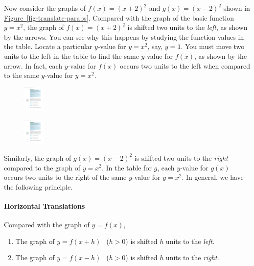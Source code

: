 \documentclass[10pt,]{book}
\theoremstyle{plain}
\theoremstyle{definition}
\theoremstyle{definition}
\theoremstyle{definition}
\theoremstyle{definition}
\theoremstyle{definition}
\numberwithin{equation}{section}
\newcommand{\gt}{ > }
\begin{document}
    Now consider the graphs of \(f (x) = (x + 2)^2\) and \(g(x) = (x − 2)^2\) shown in \hyperref[fig-translate-parabs]{Figure~\ref{fig-translate-parabs}}. Compared with the graph of the basic function \(y = x^2\), the graph of \(f (x) = (x + 2)^2\) is shifted two units to the \emph{left}, as shown by the arrows. You can see why this happens by studying the function values in the table. Locate a particular \(y\)-value for \(y = x^2\), say, \(y = 1\). You must move two units to the left in the table to find the same \(y\)-value for \(f (x)\), as shown by the arrow. In fact, each \(y\)-value for \(f (x)\) occurs two units to the left when compared to the same \(y\)-value for \(y = x^2\).
    \leavevmode%
\begin{figure}
\centering
\includegraphics[width=0.100\textwidth,]{images/fig-table-translate-left.pdf}\caption{\label{fig-table-translate-left}}
\end{figure}

%
\par

    \leavevmode%
\begin{figure}
\centering
\includegraphics[width=0.100\textwidth,]{images/fig-table-translate-right.pdf}\caption{\label{fig-table-translate-right}}
\end{figure}

    Similarly, the graph of \(g(x) = (x − 2)^2\) is shifted two units to the \emph{right} compared to the graph of \(y = x^2\). In the table for \(g\), each \(y\)-value for \(g(x)\) occurs two units to the right of the same \(y\)-value for \(y = x^2\). In general, we have the following principle.
%
\typeout{************************************************}
\typeout{************************************************}
\paragraph[Horizontal Translations]{Horizontal Translations}\label{paragraphs-28}
%
\par

    Compared with the graph of \(y = f (x)\),
    \leavevmode%
\begin{enumerate}
\item\hypertarget{li-294}{}The graph of \(y = f (x + h)~ ~\) (\(h \gt 0\)) is shifted \(h\) units to the \emph{left}.\item\hypertarget{li-295}{}The graph of \(y = f (x − h)~ ~\) (\(h \gt 0\)) is shifted \(h\) units to the \emph{right}.\end{enumerate}
\end{document}
